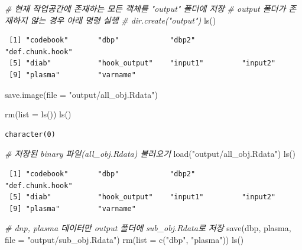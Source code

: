 \documentclass[
  11pt,
]{krantz}
\newenvironment{Shaded}{\begin{snugshade}}{\end{snugshade}}
\newcommand{\AttributeTok}[1]{\textcolor[rgb]{0.61,0.61,0.61}{#1}}
\newcommand{\CommentTok}[1]{\textcolor[rgb]{0.37,0.37,0.37}{\textit{#1}}}
\newcommand{\FunctionTok}[1]{\textcolor[rgb]{0,0,0}{#1}}
\newcommand{\NormalTok}[1]{#1}
\newcommand{\StringTok}[1]{\textcolor[rgb]{0.5,0.5,0.5}{#1}}
\begin{document}
\footnotesize

\begin{Shaded}
\begin{Highlighting}[]
\CommentTok{\# 현재 작업공간에 존재하는 모든 객체를 "output" 폴더에 저장}
\CommentTok{\# output 폴더가 존재하지 않는 경우 아래 명령 실행}
\CommentTok{\# dir.create("output") }
\FunctionTok{ls}\NormalTok{()}
\end{Highlighting}
\end{Shaded}

\begin{verbatim}
 [1] "codebook"       "dbp"            "dbp2"           "def.chunk.hook"
 [5] "diab"           "hook_output"    "input1"         "input2"        
 [9] "plasma"         "varname"       
\end{verbatim}

\begin{Shaded}
\begin{Highlighting}[]
\FunctionTok{save.image}\NormalTok{(}\AttributeTok{file =} \StringTok{"output/all\_obj.Rdata"}\NormalTok{)}

\FunctionTok{rm}\NormalTok{(}\AttributeTok{list =} \FunctionTok{ls}\NormalTok{()) }
\FunctionTok{ls}\NormalTok{()}
\end{Highlighting}
\end{Shaded}

\begin{verbatim}
character(0)
\end{verbatim}

\begin{Shaded}
\begin{Highlighting}[]
\CommentTok{\# 저장된 binary 파일(all\_obj.Rdata) 불러오기}
\FunctionTok{load}\NormalTok{(}\StringTok{"output/all\_obj.Rdata"}\NormalTok{)}
\FunctionTok{ls}\NormalTok{()}
\end{Highlighting}
\end{Shaded}

\begin{verbatim}
 [1] "codebook"       "dbp"            "dbp2"           "def.chunk.hook"
 [5] "diab"           "hook_output"    "input1"         "input2"        
 [9] "plasma"         "varname"       
\end{verbatim}

\begin{Shaded}
\begin{Highlighting}[]
\CommentTok{\# dnp, plasma 데이터만 output 폴더에 sub\_obj.Rdata로 저장}
\FunctionTok{save}\NormalTok{(dbp, plasma, }\AttributeTok{file =} \StringTok{"output/sub\_obj.Rdata"}\NormalTok{)}
\FunctionTok{rm}\NormalTok{(}\AttributeTok{list =} \FunctionTok{c}\NormalTok{(}\StringTok{"dbp"}\NormalTok{, }\StringTok{"plasma"}\NormalTok{))}
\FunctionTok{ls}\NormalTok{()}
\end{Highlighting}
\end{Shaded}
\end{document}
